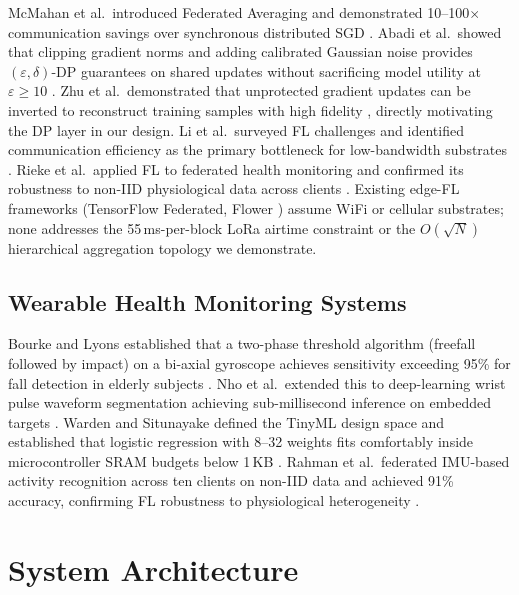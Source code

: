 \documentclass[journal]{IEEEtran}
\begin{document}
McMahan et al.\ introduced Federated Averaging and demonstrated
10--100$\times$ communication savings over synchronous distributed SGD
\cite{McMahan2017}. Abadi et al.\ showed that clipping gradient norms and
adding calibrated Gaussian noise provides $(\varepsilon,\delta)$-DP
guarantees on shared updates without sacrificing model utility at
$\varepsilon \geq 10$ \cite{Abadi2016}. Zhu et al.\ demonstrated that
unprotected gradient updates can be inverted to reconstruct training
samples with high fidelity \cite{Zhu2019}, directly motivating the DP
layer in our design. Li et al.\ surveyed FL challenges and identified
communication efficiency as the primary bottleneck for low-bandwidth
substrates \cite{Li2020}. Rieke et al.\ applied FL to federated health
monitoring and confirmed its robustness to non-IID physiological data
across clients \cite{Rieke2020}. Existing edge-FL frameworks (TensorFlow
Federated, Flower \cite{Beutel2020}) assume WiFi or cellular substrates;
none addresses the 55\,ms-per-block LoRa airtime constraint or the
$O(\sqrt{N})$ hierarchical aggregation topology we demonstrate.

\subsection{Wearable Health Monitoring Systems}

Bourke and Lyons established that a two-phase threshold algorithm
(freefall followed by impact) on a bi-axial gyroscope achieves
sensitivity exceeding 95\% for fall detection in elderly subjects
\cite{Bourke2006}. Nho et al.\ extended this to deep-learning wrist
pulse waveform segmentation achieving sub-millisecond inference on
embedded targets \cite{Nho2020}. Warden and Situnayake defined the
TinyML design space and established that logistic regression with 8--32
weights fits comfortably inside microcontroller SRAM budgets below 1\,KB
\cite{Warden2019}. Rahman et al.\ federated IMU-based activity
recognition across ten clients on non-IID data and achieved 91\%
accuracy, confirming FL robustness to physiological heterogeneity
\cite{Rahman2021}.

\section{System Architecture}
\label{sec:arch}
\end{document}
